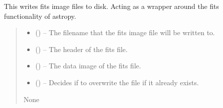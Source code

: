 \documentclass[letterpaper,11pt,english]{sphinxmanual}
\begin{document}

\begin{savenotes}\begin{fulllineitems}
\label{\detokenize{code/opihiexarata.library.fits:opihiexarata.library.fits.write_fits_image_file}}
\pysigstartsignatures
{}
\pysigstopsignatures
\sphinxAtStartPar
This writes fits image files to disk. Acting as a wrapper around the
fits functionality of astropy.
\begin{quote}\begin{description}
\begin{itemize}
\item {} 
\sphinxAtStartPar
{} () – The filename that the fits image file will be written to.

\item {} 
\sphinxAtStartPar
{} () – The header of the fits file.

\item {} 
\sphinxAtStartPar
{} () – The data image of the fits file.

\item {} 
\sphinxAtStartPar
{} (\sphinxstyleliteralemphasis{\sphinxupquote{, }}) – Decides if to overwrite the file if it already exists.

\end{itemize}

\sphinxAtStartPar
None

\end{description}\end{quote}

\end{fulllineitems}\end{savenotes}
\end{document}
